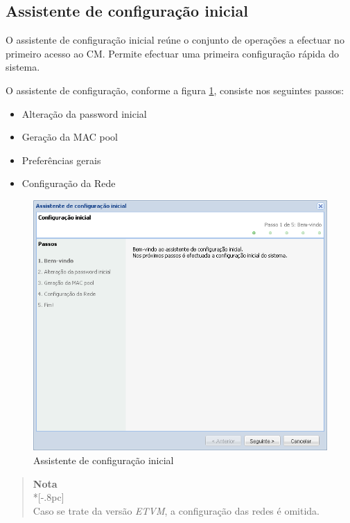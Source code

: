 \subsection{Assistente de configuração inicial}
O assistente de configuração inicial reúne o conjunto de operações a efectuar no primeiro acesso ao CM. Permite efectuar uma primeira configuração rápida do sistema.

O assistente de configuração, conforme a figura \ref{fig:first_time_wizard}, consiste nos seguintes passos:
\begin{itemize}
	\item Alteração da password inicial
	\item Geração da MAC pool
    \item Preferências gerais
	\item Configuração da Rede
\end{itemize}

\begin{figure}[H]
        \begin{center}
        \includegraphics[scale=0.7]{screenshots/first_time_wizard.png}
        \caption{Assistente de configuração inicial}
        \label{fig:first_time_wizard}
        \end{center}
\end{figure}

\begin{quote}
	{\large \bf Nota} \\*[-.8pc]
	\underline{\hspace{6in}} \\
	Caso se trate da versão \emph{ETVM}, a configuração das redes é omitida.
\end{quote}

